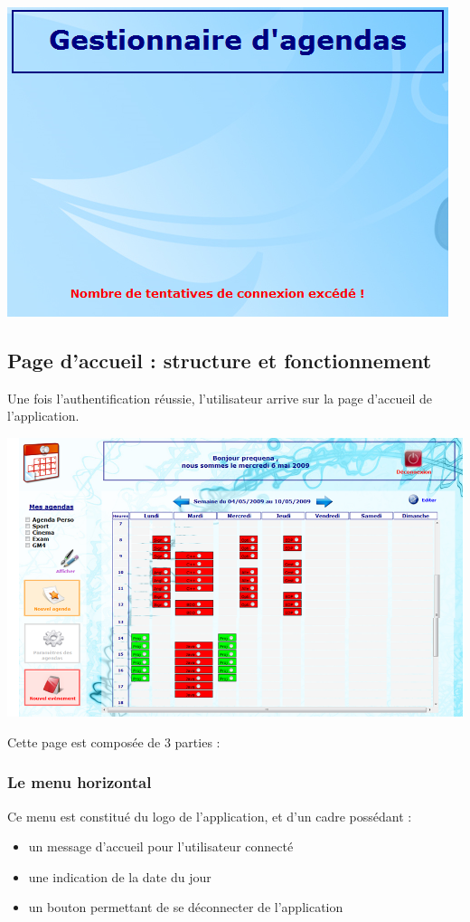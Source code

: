 \documentclass[12pt , a4paper]{article}
\begin{document}
\begin{center}
  \includegraphics[scale=0.6]{./images/authentification5.png}
\end{center}

\newpage
\subsection{Page d'accueil : structure et fonctionnement}
\noindent Une fois l’authentification réussie, l’utilisateur arrive sur la page d’accueil de l’application.

\begin{center}
  \includegraphics[scale=0.6]{./images/accueil3.png}
\end{center}


\noindent Cette page est composée de 3 parties :
\subsubsection{Le menu horizontal }
\noindent Ce menu est constitué du logo de l’application, et d’un cadre possédant :
\begin{itemize}
\item un message d’accueil pour l’utilisateur connecté
\item une indication de la date du jour
\item  un bouton permettant de se déconnecter de l’application
\end{itemize}
\end{document}
